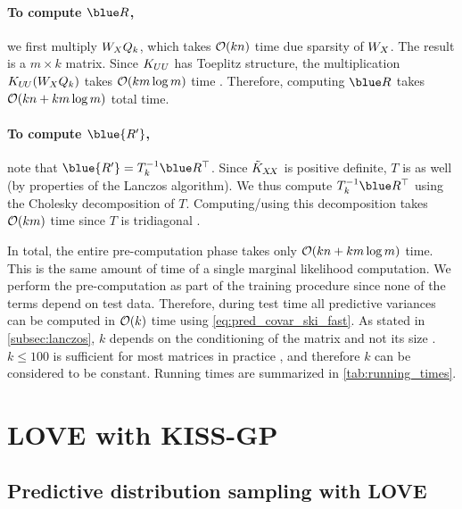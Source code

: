 \paragraph{To compute $\blue R$,} we first multiply $W_{X}Q_{k}$, which takes $\bigo{kn}$ time due sparsity of $W_{X}$.
The result is a $m \times k$ matrix.
Since $K_{UU}$ has Toeplitz structure, the multiplication $K_{U\!U} (W_{X}Q_{k})$ takes $\bigo{km \log m}$ time \cite{saatcci2012scalable}.
Therefore, computing $\blue R$ takes $\bigo{kn + km\log m}$ total time.

\paragraph{To compute $\blue {R'}$,} note that $\blue{R'} = T^{-1}_{k}\blue R^{\top}$.
Since $\tilde {K}_{X\!X}$ is positive definite, $T$ is as well (by properties of the Lanczos algorithm).
We thus compute $T^{-1}_k \blue R^\top$ using the Cholesky decomposition of $T$.
Computing/using this decomposition takes $\bigo{km}$ time since $T$ is tridiagonal \cite{loan1999introduction}.

In total, the entire pre-computation phase takes only $\bigo{kn + km \log m}$ time.
This is the same amount of time of a single marginal likelihood computation.
We perform the pre-computation as part of the training procedure since none of the terms depend on test data.
Therefore, during test time all predictive variances can be computed in $\bigo{k}$ time using \eqref{eq:pred_covar_ski_fast}.
As stated in \autoref{subsec:lanczos}, $k$ depends on the conditioning of the matrix and not its size \cite{golub2012matrix}.
$k\leq100$ is sufficient for most matrices in practice \cite{golub2012matrix}, and therefore $k$ can be considered to be constant.
Running times are summarized in \autoref{tab:running_times}.




\section{LOVE with KISS-GP}

\subsection{Predictive distribution sampling with LOVE{}}
\label{sec:sampling_method}


